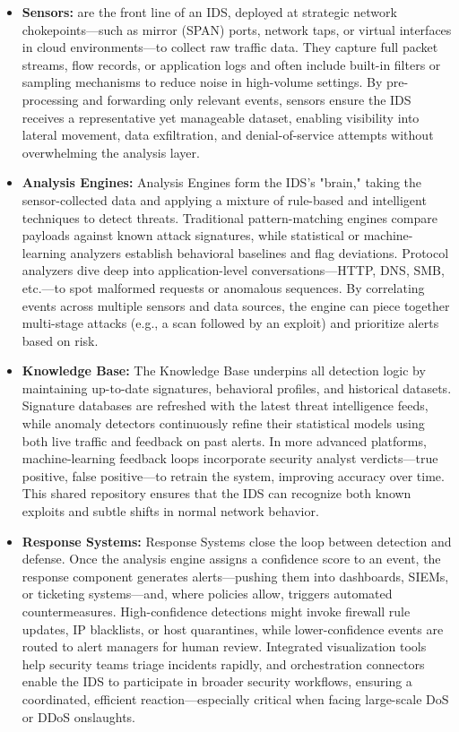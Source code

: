 \documentclass{report}
\begin{document}
\begin{itemize}
\item \textbf{Sensors:}
are the front line of an IDS, deployed at strategic network chokepoints—such as mirror (SPAN) ports, network taps, or virtual interfaces in cloud environments—to collect raw traffic data. They capture full packet streams, flow records, or application logs and often include built-in filters or sampling mechanisms to reduce noise in high-volume settings. By pre-processing and forwarding only relevant events, sensors ensure the IDS receives a representative yet manageable dataset, enabling visibility into lateral movement, data exfiltration, and denial-of-service attempts without overwhelming the analysis layer.

\item \textbf{Analysis Engines:}
Analysis Engines form the IDS's "brain," taking the sensor-collected data and applying a mixture of rule-based and intelligent techniques to detect threats. Traditional pattern-matching engines compare payloads against known attack signatures, while statistical or machine-learning analyzers establish behavioral baselines and flag deviations. Protocol analyzers dive deep into application-level conversations—HTTP, DNS, SMB, etc.—to spot malformed requests or anomalous sequences. By correlating events across multiple sensors and data sources, the engine can piece together multi-stage attacks (e.g., a scan followed by an exploit) and prioritize alerts based on risk.

\item \textbf{Knowledge Base:}
The Knowledge Base underpins all detection logic by maintaining up-to-date signatures, behavioral profiles, and historical datasets. Signature databases are refreshed with the latest threat intelligence feeds, while anomaly detectors continuously refine their statistical models using both live traffic and feedback on past alerts. In more advanced platforms, machine-learning feedback loops incorporate security analyst verdicts—true positive, false positive—to retrain the system, improving accuracy over time. This shared repository ensures that the IDS can recognize both known exploits and subtle shifts in normal network behavior.

\item \textbf{Response Systems:}
Response Systems close the loop between detection and defense. Once the analysis engine assigns a confidence score to an event, the response component generates alerts—pushing them into dashboards, SIEMs, or ticketing systems—and, where policies allow, triggers automated countermeasures. High-confidence detections might invoke firewall rule updates, IP blacklists, or host quarantines, while lower-confidence events are routed to alert managers for human review. Integrated visualization tools help security teams triage incidents rapidly, and orchestration connectors enable the IDS to participate in broader security workflows, ensuring a coordinated, efficient reaction—especially critical when facing large-scale DoS or DDoS onslaughts.
\end{itemize}
\end{document}
